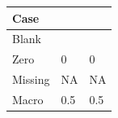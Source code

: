 \documentclass{article}
\newcommand{\sample}{0.5}
\begin{document}
\begin{tabular}{lGH}
\toprule
Case &  & \\\midrule
Blank &  & \\
Zero & 0 & 0\\
Missing & NA & NA\\
Macro & \sample & \sample\\
\bottomrule\end{tabular}\par
\end{document}
